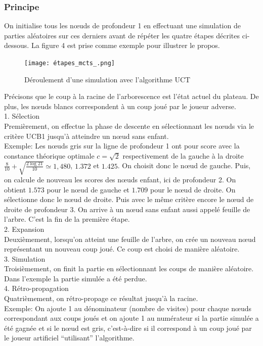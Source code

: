 \documentclass[a4paper]{article}
\theoremstyle{definition}
\begin{document}
\subsubsection{Principe}

On initialise tous les nœuds de profondeur 1 en effectuant une simulation de parties aléatoires sur ces derniers avant de répéter les quatre étapes décrites ci-dessous. La figure 4 est prise comme exemple pour illustrer le propos.

\begin{figure}[h]
\centering
\texttt{[image: étapes\_mcts\_.png]}
\caption{Déroulement d'une simulation avec l'algorithme UCT}
\label{fig:uct}
\end{figure}

Précisons que le coup à la racine de l'arborescence est l'état actuel du plateau. De plus, les nœuds blancs correspondent à un coup joué par le joueur adverse.\\

1. Sélection\\
Premièrement, on effectue la phase de descente en sélectionnant les nœuds via le critère UCB1 jusqu'à atteindre un nœud sans enfant.\\
Exemple: Les nœuds gris sur la ligne de profondeur 1 ont pour score avec la constance théorique optimale $c=\sqrt{2}$ respectivement de la gauche à la droite $\frac{8}{10} + \sqrt{\frac{2\log21}{10}} \simeq 1,480$, $1.372$ et $1.425$. On choisit donc le nœud de gauche. Puis, on calcule de nouveau les scores des nœuds enfant, ici de profondeur 2. On obtient $1.573$ pour le nœud de gauche et $1.709$ pour le nœud de droite. On sélectionne donc le nœud de droite. Puis avec le même critère encore le nœud de droite de profondeur 3. On arrive à un nœud sans enfant aussi appelé feuille de l'arbre. C'est la fin de la première étape.
\\

2. Expansion\\
Deuxièmement, lorsqu'on atteint une feuille de l'arbre, on crée un nouveau nœud représentant un nouveau coup joué. Ce coup est choisi de manière aléatoire.\\

3. Simulation\\
Troisièmement, on finit la partie en sélectionnant les coups de manière aléatoire. Dans l'exemple la partie simulée a été perdue.\\

4. Rétro-propagation\\
Quatrièmement, on rétro-propage ce résultat jusqu'à la racine.\\
Exemple: On ajoute 1 au dénominateur (nombre de visites) pour chaque nœuds correspondant aux coups joués et on ajoute 1 au numérateur si la partie simulée a été gagnée et si le nœud est gris, c'est-à-dire si il correspond à un coup joué par le joueur artificiel ``utilisant'' l'algorithme.
\end{document}
